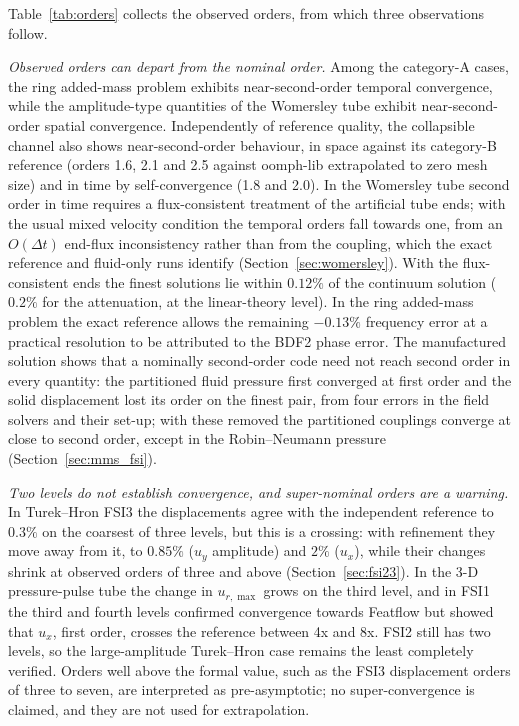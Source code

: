 Table~\ref{tab:orders} collects the observed orders, from which three observations follow.

\emph{Observed orders can depart from the nominal order.}
Among the category-A cases, the ring added-mass problem exhibits near-second-order temporal convergence, while the amplitude-type quantities of the Womersley tube exhibit near-second-order spatial convergence.
Independently of reference quality, the collapsible channel also shows near-second-order behaviour, in space against its category-B reference (orders 1.6, 2.1 and 2.5 against oomph-lib extrapolated to zero mesh size) and in time by self-convergence (1.8 and 2.0).
In the Womersley tube second order in time requires a flux-consistent treatment of the artificial tube ends; with the usual mixed velocity condition the temporal orders fall towards one, from an $O(\Delta t)$ end-flux inconsistency rather than from the coupling, which the exact reference and fluid-only runs identify (Section~\ref{sec:womersley}).
With the flux-consistent ends the finest solutions lie within $0.12\%$ of the continuum solution ($0.2\%$ for the attenuation, at the linear-theory level).
In the ring added-mass problem the exact reference allows the remaining $-0.13\%$ frequency error at a practical resolution to be attributed to the BDF2 phase error.
The manufactured solution shows that a nominally second-order code need not reach second order in every quantity: the partitioned fluid pressure first converged at first order and the solid displacement lost its order on the finest pair, from four errors in the field solvers and their set-up; with these removed the partitioned couplings converge at close to second order, except in the Robin--Neumann pressure (Section~\ref{sec:mms_fsi}).

\emph{Two levels do not establish convergence, and super-nominal orders are a warning.}
In Turek--Hron FSI3 the displacements agree with the independent reference to $0.3\%$ on the coarsest of three levels, but this is a crossing: with refinement they move away from it, to $0.85\%$ ($u_y$ amplitude) and $2\%$ ($u_x$), while their changes shrink at observed orders of three and above (Section~\ref{sec:fsi23}).
In the 3-D pressure-pulse tube the change in $u_{r,\max}$ grows on the third level, and in FSI1 the third and fourth levels confirmed convergence towards Featflow but showed that $u_x$, first order, crosses the reference between 4x and 8x.
FSI2 still has two levels, so the large-amplitude Turek--Hron case remains the least completely verified.
Orders well above the formal value, such as the FSI3 displacement orders of three to seven, are interpreted as pre-asymptotic; no super-convergence is claimed, and they are not used for extrapolation.

